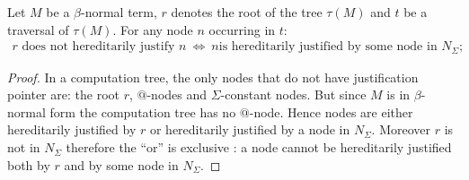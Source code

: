 \begin{lem}
\label{lem:betaeta_trav}
Let $M$ be a $\beta$-normal term, $r$ denotes the root of the tree $\tau(M)$ and
$t$ be a traversal of $\tau(M)$.
For any node $n$ occurring in $t$:
\begin{eqnarray*}
r \mbox{ does not hereditarily justify } n  \  \iff \   n \mbox{
is hereditarily justified by some node in } N_\Sigma;
\end{eqnarray*}
%
\end{lem}
\begin{proof}
 In a computation tree, the only nodes that do not have justification pointer are:
the root $r$, $@$-nodes and $\Sigma$-constant nodes.
But since $M$ is in $\beta$-normal form the computation tree has no $@$-node.
Hence nodes are either hereditarily justified by $r$ or
hereditarily justified by a node in $N_\Sigma$. Moreover $r$ is not in
$N_\Sigma$ therefore the ``or'' is exclusive : a node cannot be hereditarily justified both by $r$ and by some node in $N_\Sigma$.


\end{proof}



